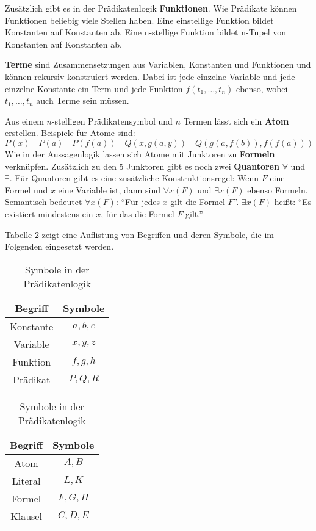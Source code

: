 Zusätzlich gibt es in der Prädikatenlogik \textbf{Funktionen}. Wie Prädikate können Funktionen beliebig viele Stellen haben. Eine einstellige Funktion bildet Konstanten auf Konstanten ab. Eine n-stellige Funktion bildet n-Tupel von Konstanten auf Konstanten ab.

\textbf{Terme} sind Zusammensetzungen aus Variablen, Konstanten und Funktionen und können rekursiv konstruiert werden. Dabei ist jede einzelne Variable und jede einzelne Konstante ein Term und jede Funktion $f(t_1,\ldots,t_n)$ ebenso, wobei $t_1,\ldots,t_n$ auch Terme sein müssen.

Aus einem $n$-stelligen Prädikatensymbol und $n$ Termen lässt sich ein \textbf{Atom} erstellen. Beispiele für Atome sind:
$$P(x) \quad P(a) \quad P(f(a)) \quad Q(x, g(a,y)) \quad Q(g(a,f(b)), f(f(a)))$$
Wie in der Aussagenlogik lassen sich Atome mit Junktoren zu \textbf{Formeln} verknüpfen. Zusätzlich zu den 5 Junktoren gibt es noch zwei \textbf{Quantoren} $\forall$ und $\exists$. Für Quantoren gibt es eine zusätzliche Konstruktionsregel:
Wenn $F$ eine Formel und $x$ eine Variable ist, dann sind $\forall x(F)$ und $\exists x(F)$ ebenso Formeln.
Semantisch bedeutet $\forall x(F)$: "`Für jedes $x$ gilt die Formel $F$"'.  $\exists x(F)$ heißt: "`Es existiert mindestens ein $x$, für das die Formel $F$ gilt."'

Tabelle \ref{table:symbole} zeigt eine Auflistung von Begriffen und deren Symbole, die im Folgenden eingesetzt werden.

\begin{table}
	\centering
	\begin{tabular}{|c|c|}
		\hline
		Begriff & Symbole \\ \hline\hline
		Konstante & $a,b,c$ \\\hline
		Variable & $x,y,z$ \\ \hline
		Funktion & $f, g, h$ \\\hline
		Prädikat & $P, Q, R$ \\\hline
	\end{tabular}
	\begin{tabular}{|c|c|}
		\hline
		Begriff & Symbole \\ \hline\hline
		Atom & $A, B$ \\\hline
		Literal & $L, K$ \\\hline
		Formel & $F, G, H$ \\\hline
		Klausel & $C, D, E$ \\\hline
	\end{tabular}
	\caption{Symbole in der Prädikatenlogik}
	\label{table:symbole}
\end{table}

